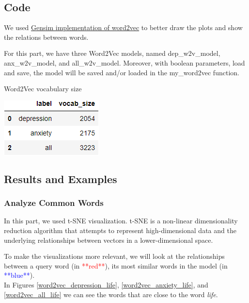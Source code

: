 \documentclass[12pt, a4paper]{article}
\begin{document}
	\subsection{Code}
	We used \href{https://radimrehurek.com/gensim/models/word2vec.html}{Gensim implementation of word2vec} to better draw the plots and show the relations between words. 
	
	For this part, we have three Word2Vec models, named dep\_w2v\_model, anx\_w2v\_model, and all\_w2v\_model. Moreover, with boolean parameters, load and save, the model will be saved and/or loaded in the my\_word2vec function.
	
	\begin{table}[H]
		\caption{Word2Vec vocabulary size} 
		\centering 
		\vspace{5mm} 
		\includegraphics[width=0.5\linewidth]{../reports/images/w2v_vocab-size.png}
		\label{w2v_vocab-size} 
	\end{table}
	
	
	\subsection{Results and Examples}
	
	\subsubsection{Analyze Common Words}
	In this part, we used t-SNE visualization. t-SNE is a non-linear dimensionality reduction algorithm that attempts to represent high-dimensional data and the underlying relationships between vectors in a lower-dimensional space.
	
	To make the visualizations more relevant, we will look at the relationships between a query word (in \textcolor{red}{**red**}), its most similar words in the model (in \textcolor{blue}{**blue**}).\\
	
	In Figures \ref{word2vec_depression_life}, \ref{word2vec_anxiety_life}, and \ref{word2vec_all_life} we can see the words that are close to the word \emph{life}. 
	
\end{document}
